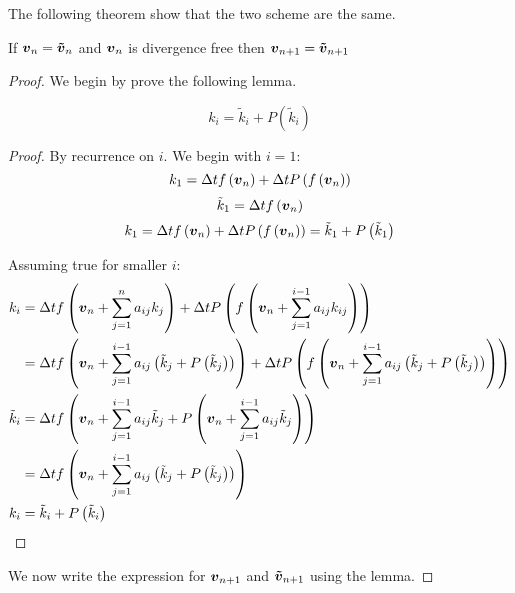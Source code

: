 The following theorem show that the two scheme are the same.

\begin{theorem}
If ${\boldsymbol {v}}_{n}={\boldsymbol {\tilde{v}}}_{n}$ and ${\boldsymbol {v}}_n$ is divergence free then ${\boldsymbol {v}}_{n+1}={\boldsymbol {\tilde{v}}}_{n+1}$ 
\end{theorem}
\begin{proof}
We begin by prove the following lemma.
\begin{lemma}
\begin{equation}
  k_{i}=\tilde{k}_{i}+P(\tilde{k}_{i})
\end{equation}
\end{lemma}
\begin{proof}
By recurrence on $i$.
We begin with $i=1$:
\begin{equation}
  k_{1}=\Delta tf\left({\boldsymbol {v}}_n\right)+\Delta tP\left(f\left({\boldsymbol {v}}_n\right)\right)
\end{equation}
\begin{equation}
\tilde{k}_{1}=\Delta tf\left({\boldsymbol {v}}_n\right)
\end{equation}
\begin{equation}
  k_{1}=\Delta t f\left({\boldsymbol {v}}_n\right)+\Delta tP\left(f\left({\boldsymbol {v}}_n\right)\right)=\tilde{k}_1+P\left(\tilde{k}_1\right)
\end{equation}

Assuming true for smaller $i$:
\begin{align*}
  k_{i}&=\Delta tf\left({\boldsymbol {v}}_n+\sum_{j=1}^{n}a_{ij}k_{j}\right)+\Delta tP\left(f\left({\boldsymbol {v}}_n+\sum_{j=1}^{i-1}a_{ij}k_{ij}\right)\right)\\
  &=\Delta tf\left({\boldsymbol {v}}_n+\sum_{j=1}^{i-1}a_{ij}\left(\tilde{k}_{j}+P\left(\tilde{k}_{j}\right)\right)\right)+\Delta tP\left(f\left({\boldsymbol {v}}_n+\sum_{j=1}^{i-1}a_{ij}\left(\tilde{k}_{j}+P\left(\tilde{k}_{j}\right)\right)\right)\right)\\
  \tilde{k}_{i}&=\Delta tf\left({\boldsymbol {v}}_n+\sum_{j=1}^{i-1}a_{ij}\tilde{k}_{j}+P\left({\boldsymbol {v}}_n+\sum_{j=1}^{i-1}a_{ij}\tilde{k}_{j}\right)\right)\\
  &=\Delta tf\left({\boldsymbol {v}}_n+\sum_{j=1}^{i-1}a_{ij}\left(\tilde{k}_{j}+P\left(\tilde{k}_{j}\right)\right)\right)\\
  k_{i}&=\tilde{k}_{i}+P\left(\tilde{k}_{i}\right)
\end{align*}
\end{proof}

We now write the expression for ${\boldsymbol {v}}_{n+1}$ and ${\boldsymbol {\tilde{v}}}_{n+1}$ using the lemma.


\end{proof}
